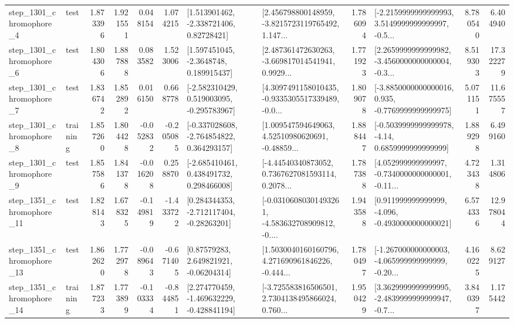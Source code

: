 \begin{tabular}{llrrrrllrlrr}
  step\_1301\_chromophore\_4 &      test &      1.873396 &    1.921551 &      0.048154 &  1.074215 &     [1.513901462, -2.338721406, 0.82728421] &  [2.456798800148959, -3.8215723119765492, 1.147... &       1.786094 &  [-2.2159999999999993, 3.5149999999999997, -0.5... &            8.780540 &          6.404940 \\
  step\_1301\_chromophore\_6 &      test &      1.804306 &    1.887888 &      0.083582 &  1.523006 &      [1.597451045, -2.3648748, 0.189915437] &  [2.487361472630263, -3.669817014541941, 0.9929... &       1.771923 &  [2.2659999999999982, -3.4560000000000004, -0.3... &            8.519303 &         17.322279 \\
  step\_1301\_chromophore\_7 &      test &      1.836742 &    1.852892 &      0.016150 &  0.668778 &   [-2.582310429, 0.519003095, -0.295783967] &  [4.3097491158010435, -0.9335305517339489, -0.0... &       1.809078 &  [-3.8850000000000016, 0.935, -0.7769999999999975] &            5.071151 &         11.675557 \\
  step\_1301\_chromophore\_8 &  training &      1.857260 &    1.804428 &     -0.052832 & -0.205085 &   [-0.337028608, -2.764854822, 0.364293157] &  [1.009547594649063, 4.52510980620691, -0.48859... &       1.888447 &   [-0.5039999999999978, -4.14, 0.6859999999999999] &            1.889298 &          6.499160 \\
  step\_1301\_chromophore\_9 &      test &      1.857586 &    1.841378 &     -0.016208 &  0.258870 &    [-2.685410461, 0.438491732, 0.298466008] &  [-4.44540340873052, 0.7367627081593114, 0.2078... &       1.787388 &  [4.052999999999997, -0.7340000000000001, -0.11... &            4.723438 &          1.314806 \\
 step\_1351\_chromophore\_11 &      test &      1.828143 &    1.678325 &     -0.149819 & -1.433722 &    [0.284344353, -2.712117404, -0.28263201] &  [-0.03106080301493261, -4.583632708909812, -0.... &       1.943588 &   [0.911999999999999, -4.096, -0.4930000000000021] &            6.574336 &         12.978044 \\
 step\_1351\_chromophore\_13 &      test &      1.862620 &    1.772978 &     -0.089643 & -0.671405 &      [0.87579283, 2.649821921, -0.06204314] &  [1.5030040160160796, 4.271690961846226, -0.444... &       1.780497 &  [-1.267000000000003, -4.065999999999999, -0.20... &            4.160225 &          8.629127 \\
 step\_1351\_chromophore\_14 &  training &      1.877233 &    1.773899 &     -0.103334 & -0.844851 &   [2.274770459, -1.469632229, -0.428841194] &  [-3.725583816506501, 2.7304138495866024, 0.760... &       1.950429 &  [3.3629999999999995, -2.4839999999999947, -0.7... &            3.840397 &          1.175442 \\

\end{tabular}
